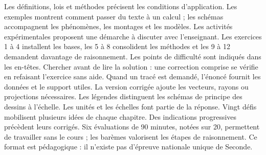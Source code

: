 Les définitions, lois et méthodes précisent les conditions d'application. Les exemples montrent comment passer du texte à un calcul ; les schémas accompagnent les phénomènes, les montages et les modèles. Les activités expérimentales proposent une démarche à discuter avec l'enseignant.
Les exercices 1 à 4 installent les bases, les 5 à 8 consolident les méthodes et les 9 à 12 demandent davantage de raisonnement. Les points de difficulté sont indiqués dans les en-têtes. Chercher avant de lire la solution : une correction comprise se vérifie en refaisant l'exercice sans aide.
Quand un tracé est demandé, l'énoncé fournit les données et le support utiles. La version corrigée ajoute les vecteurs, rayons ou projections nécessaires. Les légendes distinguent les schémas de principe des dessins à l'échelle. Les unités et les échelles font partie de la réponse.
Vingt défis mobilisent plusieurs idées de chaque chapitre. Des indications progressives précèdent leurs corrigés. Six évaluations de 90 minutes, notées sur 20, permettent de travailler sans le cours ; les barèmes valorisent les étapes de raisonnement. Ce format est pédagogique : il n'existe pas d'épreuve nationale unique de Seconde.
\clearpage
